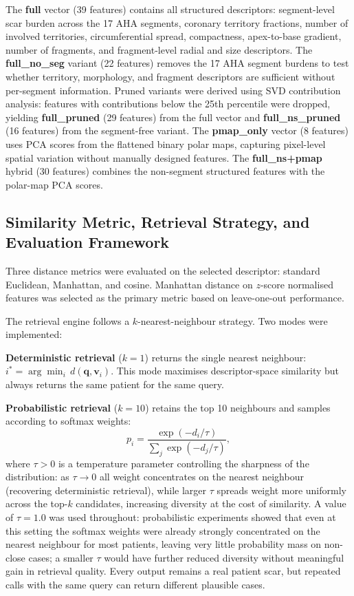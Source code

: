 The \textbf{full} vector (39 features) contains all structured descriptors: segment-level scar
burden across the 17 AHA segments, coronary territory fractions, number of involved
territories, circumferential spread, compactness, apex-to-base gradient, number of
fragments, and fragment-level radial and size descriptors. The \textbf{full\_no\_seg} variant
(22 features) removes the 17 AHA segment burdens to test whether territory, morphology,
and fragment descriptors are sufficient without per-segment information. Pruned variants
were derived using SVD contribution analysis: features with contributions below the 25th
percentile were dropped, yielding \textbf{full\_pruned} (29 features) from the full vector and
\textbf{full\_ns\_pruned} (16 features) from the segment-free variant. The
\textbf{pmap\_only} vector (8 features) uses PCA scores from the flattened binary polar
maps, capturing pixel-level spatial variation without manually designed features. The
\textbf{full\_ns+pmap} hybrid (30 features) combines the non-segment structured features
with the polar-map PCA scores.

\subsection{Similarity Metric, Retrieval Strategy, and Evaluation Framework}

Three distance metrics were evaluated on the selected descriptor: standard Euclidean,
Manhattan, and cosine. Manhattan distance on $z$-score normalised features was selected
as the primary metric based on leave-one-out performance.

The retrieval engine follows a $k$-nearest-neighbour strategy. Two modes were implemented:

\textbf{Deterministic retrieval} ($k = 1$) returns the single nearest neighbour:
$i^* = \arg\min_i\, d(\mathbf{q}, \mathbf{v}_i)$.
This mode maximises descriptor-space similarity but always returns the same patient for the
same query.

\textbf{Probabilistic retrieval} ($k = 10$) retains the top 10 neighbours and samples
according to softmax weights:
\begin{equation}
    p_i = \frac{\exp(-d_i/\tau)}{\sum_j \exp(-d_j/\tau)},
    \label{eq:softmax}
\end{equation}
where $\tau > 0$ is a temperature parameter controlling the sharpness of the distribution:
as $\tau \to 0$ all weight concentrates on the nearest neighbour (recovering deterministic
retrieval), while larger $\tau$ spreads weight more uniformly across the top-$k$ candidates,
increasing diversity at the cost of similarity. A value of $\tau = 1.0$ was used throughout:
probabilistic experiments showed that even at this setting the softmax weights were already
strongly concentrated on the nearest neighbour for most patients, leaving very little
probability mass on non-close cases; a smaller $\tau$ would have further reduced diversity
without meaningful gain in retrieval quality. Every output remains a real patient scar,
but repeated calls with the same query can return different plausible cases.

